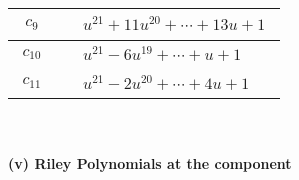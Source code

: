 \documentclass[1p]{elsarticle_modified}
\theoremstyle{definition}
\begin{document}
\begin{tabular}{m{50pt}|m{274pt}}
\hline $$\begin{aligned}c_{9}\end{aligned}$$&$\begin{aligned}
&u^{21}+11 u^{20}+\cdots+13 u+1
\end{aligned}$\\
\hline $$\begin{aligned}c_{10}\end{aligned}$$&$\begin{aligned}
&u^{21}-6 u^{19}+\cdots+u+1
\end{aligned}$\\
\hline $$\begin{aligned}c_{11}\end{aligned}$$&$\begin{aligned}
&u^{21}-2 u^{20}+\cdots+4 u+1
\end{aligned}$\\
\hline
\end{tabular}\\~\\
\newpage\renewcommand{\arraystretch}{1}
\flushleft \textbf{(v) Riley Polynomials at the component}\newline \\
\end{document}
